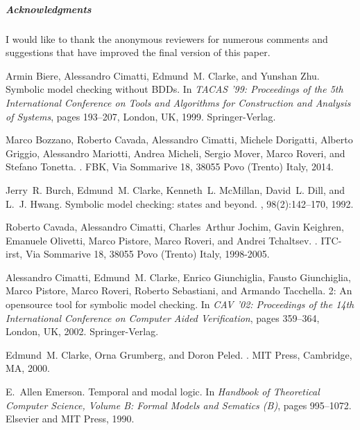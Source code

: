 \documentclass[a4paper,UKenglish]{lipics}
\begin{document}
\subparagraph*{Acknowledgments}
I would like to thank the anonymous reviewers for numerous comments and suggestions that have improved the final version of this paper.









\begin{thebibliography}{1}

Armin Biere, Alessandro Cimatti, Edmund~M. Clarke, and Yunshan Zhu.
\newblock Symbolic model checking without {BDDs}.
\newblock In {\em TACAS '99: Proceedings of the 5th International Conference on
  Tools and Algorithms for Construction and Analysis of Systems}, pages
  193--207, London, UK, 1999. Springer-Verlag.

Marco Bozzano, Roberto Cavada, Alessandro Cimatti, Michele Dorigatti, Alberto
  Griggio, Alessandro Mariotti, Andrea Micheli, Sergio Mover, Marco Roveri, and
  Stefano Tonetta.
.
\newblock FBK, Via Sommarive 18, 38055 Povo (Trento) Italy, 2014.

Jerry~R. Burch, Edmund~M. Clarke, Kenneth~L. McMillan, David~L. Dill, and L.~J.
  Hwang.
\newblock Symbolic model checking:  states and beyond.
, 98(2):142--170, 1992.

Roberto Cavada, Alessandro Cimatti, Charles~Arthur Jochim, Gavin Keighren,
  Emanuele Olivetti, Marco Pistore, Marco Roveri, and Andrei Tchaltsev.
.
\newblock ITC-irst, Via Sommarive 18, 38055 Povo (Trento) Italy, 1998-2005.

Alessandro Cimatti, Edmund~M. Clarke, Enrico Giunchiglia, Fausto Giunchiglia,
  Marco Pistore, Marco Roveri, Roberto Sebastiani, and Armando Tacchella.
 2: An opensource tool for symbolic model checking.
\newblock In {\em CAV '02: Proceedings of the 14th International Conference on
  Computer Aided Verification}, pages 359--364, London, UK, 2002.
  Springer-Verlag.

Edmund~M. Clarke, Orna Grumberg, and Doron Peled.
.
\newblock MIT Press, Cambridge, MA, 2000.

E.~Allen Emerson.
\newblock Temporal and modal logic.
\newblock In {\em Handbook of Theoretical Computer Science, Volume B: Formal
  Models and Sematics (B)}, pages 995--1072. Elsevier and MIT Press, 1990.


\end{thebibliography}
\end{document}
